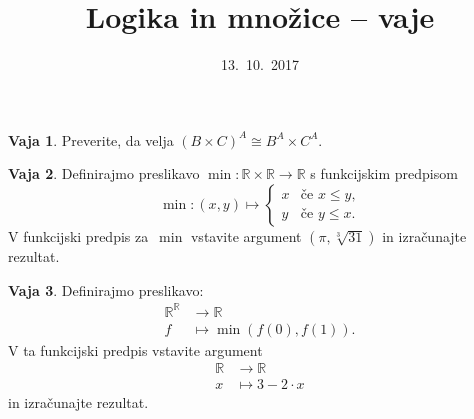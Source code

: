 \documentclass{article}
\newcommand{\RR}{\mathbb{R}}
\theoremstyle{definition}
\newtheorem{vaja}{Vaja}
\begin{document}
\title{Logika in množice -- vaje}
\date{13.~10.~2017}
\maketitle

\begin{vaja}
  Preverite, da velja $(B \times C)^A \cong B^A \times C^A$.
\end{vaja}

\begin{vaja}
  Definirajmo preslikavo $\min : \RR \times \RR \to \RR$ s funkcijskim predpisom
  \begin{equation*}
    \min : (x, y) \mapsto
    \begin{cases}
      x & \text{če $x \leq y$,} \\
      y & \text{če $y \leq x$.}
    \end{cases}
  \end{equation*}
  V funkcijski predpis za~$\min$ vstavite argument $(\pi, \sqrt[3]{31})$ in izračunajte
  rezultat.
\end{vaja}

\begin{vaja}
  Definirajmo preslikavo:
  \begin{align*}
    \RR^\RR &\to \RR \\
    f &\mapsto \min (f(0), f(1)).
  \end{align*}
  V ta funkcijski predpis vstavite argument
  \begin{align*}
    \RR &\to \RR \\
    x &\mapsto 3 - 2 \cdot x
  \end{align*}
  in izračunajte rezultat.
\end{vaja}
\end{document}
